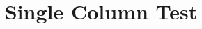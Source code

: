 \documentclass{article}
\title{Single Column Test}
\date{\vspace{-1.5cm}}
\begin{document}
\maketitle
\makeversionapprovaltable
\end{document}
